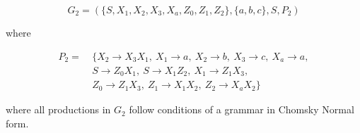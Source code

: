 \begin{equation}
G_2 = (\{S, X_1, X_2, X_3, X_a, Z_0, Z_1, Z_2\},\{a, b, c\},S,P_2)
\end{equation}

where

\begin{equation}
\begin{aligned}
P_2 =\ & \{ X_2 \rightarrow X_3 X_1,\ X_1 \rightarrow a,\ X_2 \rightarrow b,\ X_3 \rightarrow c,\ X_a \rightarrow a, \\
& S\rightarrow Z_0X_1,\ S\rightarrow X_1Z_2,\ X_1\rightarrow Z_1X_3, \\
& Z_0\rightarrow Z_1X_3,\ Z_1\rightarrow X_1X_2,\ Z_2\rightarrow X_aX_2 \}
\end{aligned}
\end{equation}

where all productions in $G_2$ follow conditions of a grammar in Chomsky Normal form.
